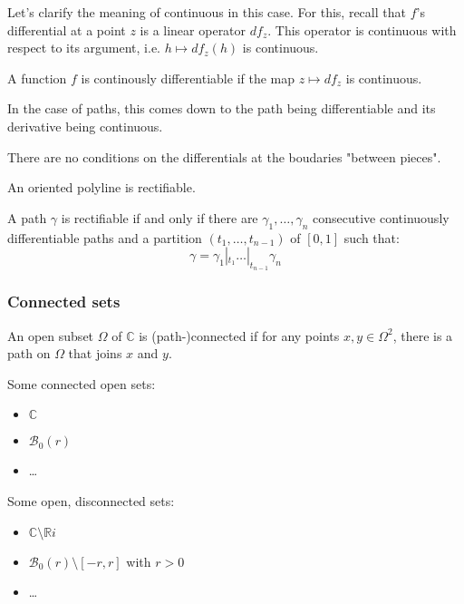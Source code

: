 \begin{note}
    Let's clarify the meaning of continuous in this case. For this, recall that $f$'s differential at a point $z$ is a linear operator $df_z$. This operator is continuous with respect to its argument, i.e. $h \mapsto df_z(h)$ is continuous.

    A function $f$ is continously differentiable if the map $z \mapsto df_z$ is continuous.

    In the case of paths, this comes down to the path being differentiable and its derivative being continuous.
\end{note}

\begin{note}
    There are no conditions on the differentials at the boudaries "between pieces".
\end{note}

\begin{example}
    An oriented polyline is rectifiable.
\end{example}

\begin{thm*}
    A path $\gamma$ is rectifiable if and only if there are $\gamma_1, \dots, \gamma_n$ consecutive continuously differentiable paths and a partition $(t_1, \dots, t_{n-1})$ of $[0,1]$ such that:
    $$\gamma = \gamma_1 |_{t_1} \dots |_{t_{n-1}} \gamma_n$$
\end{thm*}

\subsubsection{Connected sets}

\begin{defi}
    An open subset $\Omega$ of $\mathbb{C}$ is (path-)connected if for any points $x,y \in \Omega^2$, there is a path on $\Omega$ that joins $x$ and $y$. 
\end{defi}

\begin{example}
    
    Some connected open sets:
    \begin{itemize}
        \item $\mathbb{C}$
        \item $\mathcal{B}_0(r)$
        \item \dots
    \end{itemize}
    Some open, disconnected sets:
    \begin{itemize}
        \item $\mathbb{C} \setminus \mathbb{R}i$
        \item $\mathcal{B}_0(r) \setminus [-r, r]$ with $r > 0$
        \item \dots
    \end{itemize}
\end{example}

